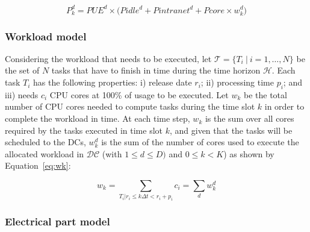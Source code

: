 \begin{equation} \label{eq:power_cons}
   P^d_k  = PUE^d \times \big( Pidle^d + Pintranet^d + Pcore \times w^d_k\big)
\end{equation}



\subsubsection{Workload model}

Considering the workload that needs to be executed, let $\mathcal{T} = \{T_i \ | \ i=1, \ldots, N\}$ be the set of $N$ tasks that have to finish in time during the time horizon $\mathcal{H}$. Each task $T_i$ has the following properties: i) release date $r_i$; ii)  processing time $p_i$;  and iii) needs $c_i$ CPU cores at 100\% of usage to be executed. Let $w_k$ be the total number of CPU cores needed to compute tasks during the time slot $k$ in order to complete the workload in time. At each time step, $w_k$ is the sum over all cores required by the tasks executed in time slot $k$, and given that the tasks will be scheduled to the DCs,  $w_k^d$ is the sum of the number of cores used to execute the allocated workload in $\mathcal{DC}$ (with $1\leq d\leq D)$ and $0\leq k<K$) as shown by Equation~\eqref{eq:wk}:

\begin{equation} \label{eq:wk}
    w_k = \sum_{T_i|r_i\leq k\Delta t<r_i+p_i} c_i = \sum_d w_k^d
\end{equation}


\subsubsection{Electrical part model}


